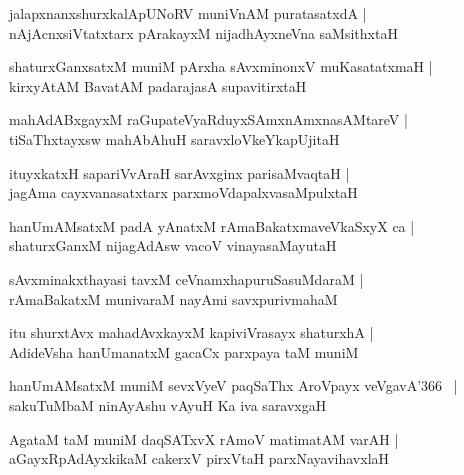 \documentclass[twoside,12pt,openright]{book}
\newcounter{shloka}[chapter]
\begin{document}
\begin{shloka}%
jalapxnanxshurxkalApUNoRV muniVnAM puratasatxdA |\\
nAjAcnxsiVtatxtarx pArakayxM nijadhAyxneVna saMsithxtaH 
\end{shloka}

\begin{shloka}%
shaturxGanxsatxM muniM pArxha sAvxminonxV muKasatatxmaH |\\
kirxyAtAM BavatAM padarajasA supavitirxtaH
\end{shloka}

\begin{shloka}%
mahAdABxgayxM raGupateVyaRduyxSAmxnAmxnasAMtareV |\\
tiSaThxtayxsw mahAbAhuH saravxloVkeYkapUjitaH
\end{shloka}

\begin{shloka}%
 ituyxkatxH sapariVvAraH sarAvxginx parisaMvaqtaH |\\
jagAma cayxvanasatxtarx parxmoVdapalxvasaMpulxtaH
\end{shloka}

\begin{shloka}%
hanUmAMsatxM padA yAnatxM rAmaBakatxmaveVkaSxyX ca |\\
shaturxGanxM nijagAdAsw vacoV vinayasaMayutaH  
\end{shloka}

\begin{shloka}%
sAvxminakxthayasi tavxM ceVnamxhapuruSasuMdaraM |\\
rAmaBakatxM munivaraM nayAmi savxpurivmahaM 
\end{shloka}

\begin{shloka}%
itu shurxtAvx mahadAvxkayxM kapiviVrasayx shaturxhA |\\
AdideVsha hanUmanatxM gacaCx parxpaya taM muniM 
\end{shloka}

\begin{shloka}%
hanUmAMsatxM muniM sevxVyeV paqSaThx AroVpayx veVgavA\char'366 ~|\\
sakuTuMbaM ninAyAshu vAyuH Ka iva saravxgaH 
\end{shloka}

\begin{shloka}%
AgataM taM muniM daqSATxvX rAmoV matimatAM varAH |\\
aGayxRpAdAyxkikaM cakerxV pirxVtaH parxNayavihavxlaH 
\end{shloka}
\end{document}

